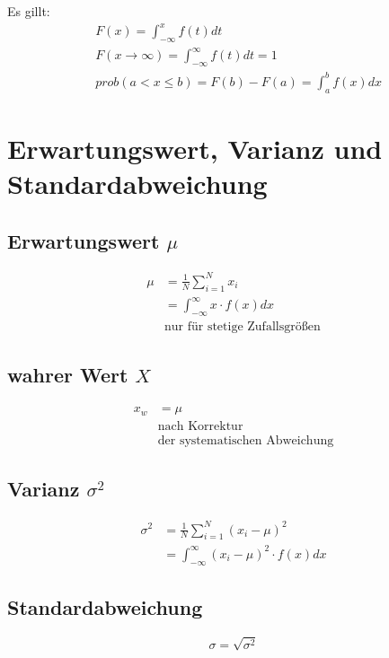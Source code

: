 Es gillt:
\begin{align*}
	&F\left(x\right) = \int_{-\infty}^{x} f\left(t\right)dt\\
	&F\left(x \rightarrow \infty \right) = \int_{-\infty}^{\infty}
	f\left(t\right)dt = 1\\
	&prob\left( a < x \leq b \right) = F\left(b\right) - F\left(a\right) =
	\int_{a}^{b}f\left(x\right)dx
\end{align*}

\section{Erwartungswert, Varianz und Standardabweichung}
\begin{multicols}{2}
	\subsection{Erwartungswert \texorpdfstring{$\mu$}{}}
		\begin{align*}
			\mu &= \frac{1}{N} \sum_{i = 1}^{N} x_i\\
				&= \int_{-\infty}^{\infty} x \cdot f\left(x\right)dx\\ 
				&\text{nur für stetige Zufallsgrößen}
		\end{align*}
		\vfill
	\subsection{wahrer Wert \texorpdfstring{$X$}{}}
		\begin{align*}
			x_w &= \mu\\
				&\text{nach Korrektur} \\ 
				&\text{der systematischen Abweichung}
		\end{align*}
		\vspace{5mm}
		\vfill
\end{multicols}

\begin{multicols}{2}
	\subsection{Varianz \texorpdfstring{$\sigma^2$}{}}
		\begin{align*}
			\sigma^2 &= \frac{1}{N} \sum_{i = 1}^{N}\left( x_i - \mu \right)^2\\
					 &= \int_{-\infty}^{\infty}\left( x_i - \mu \right)^2 \cdot f\left( 
					x \right)dx
		\end{align*}
		\vfill
	\subsection{Standardabweichung}
		\[\sigma = \sqrt{\sigma^2}\]
		\vspace{5mm}
		\vfill
\end{multicols}

